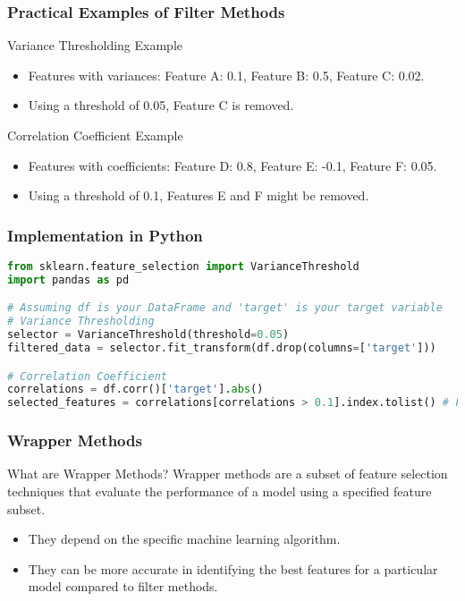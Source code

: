\documentclass[aspectratio=169]{beamer}
\begin{document}
\begin{frame}[fragile]
    \frametitle{Practical Examples of Filter Methods}
    \begin{block}{Variance Thresholding Example}
        \begin{itemize}
            \item Features with variances: Feature A: 0.1, Feature B: 0.5, Feature C: 0.02.
            \item Using a threshold of 0.05, Feature C is removed.
        \end{itemize}
    \end{block}

    \begin{block}{Correlation Coefficient Example}
        \begin{itemize}
            \item Features with coefficients: Feature D: 0.8, Feature E: -0.1, Feature F: 0.05.
            \item Using a threshold of 0.1, Features E and F might be removed.
        \end{itemize}
    \end{block}
\end{frame}

\begin{frame}[fragile]
    \frametitle{Implementation in Python}
    \begin{lstlisting}[language=Python]
from sklearn.feature_selection import VarianceThreshold
import pandas as pd

# Assuming df is your DataFrame and 'target' is your target variable
# Variance Thresholding
selector = VarianceThreshold(threshold=0.05)
filtered_data = selector.fit_transform(df.drop(columns=['target']))

# Correlation Coefficient
correlations = df.corr()['target'].abs()
selected_features = correlations[correlations > 0.1].index.tolist() # Features selected
    \end{lstlisting}
\end{frame}

\begin{frame}[fragile]
    \frametitle{Wrapper Methods}
    \begin{block}{What are Wrapper Methods?}
        Wrapper methods are a subset of feature selection techniques that evaluate the performance of a model using a specified feature subset. 
        \begin{itemize}
            \item They depend on the specific machine learning algorithm.
            \item They can be more accurate in identifying the best features for a particular model compared to filter methods.
        \end{itemize}
    \end{block}
\end{frame}
\end{document}
